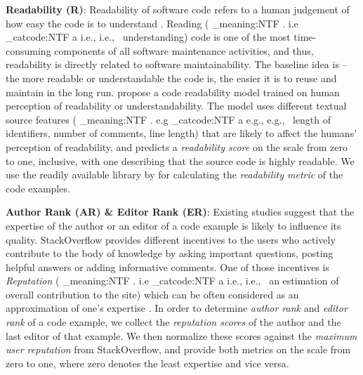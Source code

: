 \documentclass[conference]{IEEEtran}
\makeatletter
\newcommand\latinabbrev[1]{
  \peek_meaning:NTF . {%
    #1\@}%
  { \peek_catcode:NTF a {%
      #1., \@ }%
    {#1., \@}}}
\def\eg{\latinabbrev{e.g}}
\def\ie{\latinabbrev{i.e}}
\makeatother
\begin{document}
\textbf{Readability (R)}: Readability of software code refers to a human judgement of how easy the code is to understand \cite{readability}. Reading (\ie\ understanding) code is one of the most time-consuming components of all software maintenance activities, and thus, readability is directly related to software maintainability. 
The baseline idea is -- the more readable or understandable the code is, the easier it is to reuse and maintain in the long run. \citet{readability} propose a code readability model trained on human perception of readability or understandability. The model uses different textual source features (\eg\ length of identifiers, number of comments, line length) that are likely to affect the humans' perception of readability, and predicts a \emph{readability score} on the scale from zero to one, inclusive, with one describing that the source code is highly readable. We use the readily available library \cite{readlib} by \citet{readability} for calculating the \emph{readability metric} of the code examples.
 
\textbf{Author Rank (AR) \& Editor Rank (ER)}: Existing studies \cite{specmining} suggest that the expertise of the author or an editor of a code example is likely to influence its quality. 
StackOverflow provides different incentives to the users who actively contribute to the body of knowledge by asking important questions, posting helpful answers or adding informative comments. One of those incentives is \emph{Reputation} (\ie\ an estimation of overall contribution to the site) which can be often considered as an approximation of one's expertise \cite{expert1}. 
In order to determine \emph{author rank} and \emph{editor rank} of a code example, we collect the \emph{reputation scores} of the author and the last editor of that example. We then normalize these scores against the \emph{maximum user reputation} from StackOverflow, and provide both metrics on the scale from zero to one, where zero denotes the least expertise and vice versa.
\end{document}
